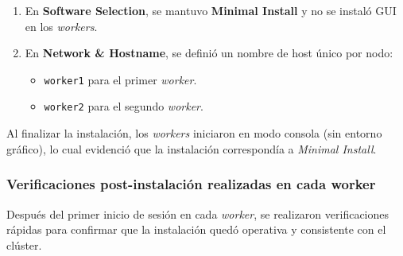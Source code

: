 \begin{enumerate}
  \item En \textbf{Software Selection}, se mantuvo \textbf{Minimal Install} y no se instaló GUI en los \textit{workers}.

  \item En \textbf{Network \& Hostname}, se definió un nombre de host único por nodo:
  \begin{itemize}
    \item \texttt{worker1} para el primer \textit{worker}.
    \item \texttt{worker2} para el segundo \textit{worker}.
  \end{itemize}
\end{enumerate}

Al finalizar la instalación, los \textit{workers} iniciaron en modo consola (sin entorno gráfico), lo cual evidenció que la instalación correspondía a \textit{Minimal Install}.


\subsubsection*{Verificaciones post-instalación realizadas en cada worker}
Después del primer inicio de sesión en cada \textit{worker}, se realizaron verificaciones rápidas para confirmar que la instalación quedó operativa y consistente con el clúster.

